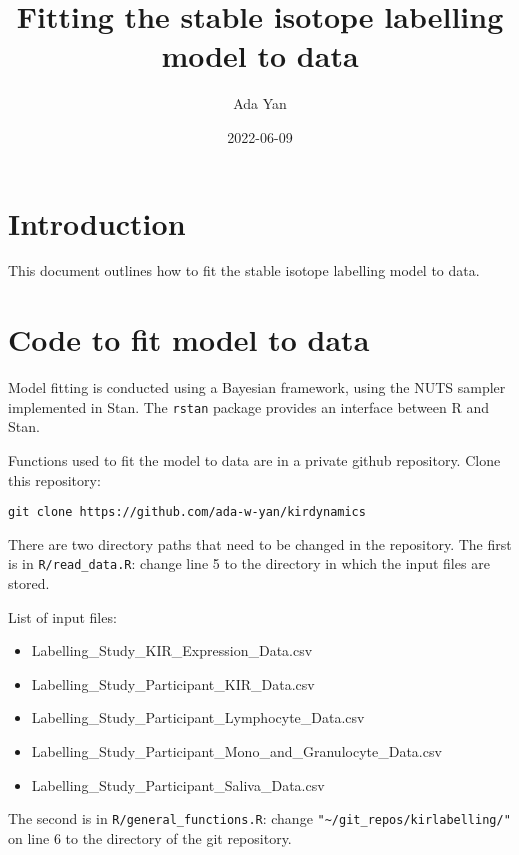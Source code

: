\documentclass[
]{article}
\title{Fitting the stable isotope labelling model to data}
\author{Ada Yan}
\date{2022-06-09}
\providecommand{\tightlist}{%
  \setlength{\itemsep}{0pt}\setlength{\parskip}{0pt}}
\begin{document}
\maketitle

\hypertarget{introduction}{%
\section{Introduction}\label{introduction}}

This document outlines how to fit the stable isotope labelling model to
data.

\hypertarget{code-to-fit-model-to-data}{%
\section{Code to fit model to data}\label{code-to-fit-model-to-data}}

Model fitting is conducted using a Bayesian framework, using the NUTS
sampler implemented in Stan. The \texttt{rstan} package provides an
interface between R and Stan.

Functions used to fit the model to data are in a private github
repository. Clone this repository:

\begin{verbatim}
git clone https://github.com/ada-w-yan/kirdynamics
\end{verbatim}

There are two directory paths that need to be changed in the repository.
The first is in \texttt{R/read\_data.R}: change line 5 to the directory
in which the input files are stored.

List of input files:

\begin{itemize}
\tightlist
\item
  Labelling\_Study\_KIR\_Expression\_Data.csv
\item
  Labelling\_Study\_Participant\_KIR\_Data.csv
\item
  Labelling\_Study\_Participant\_Lymphocyte\_Data.csv
\item
  Labelling\_Study\_Participant\_Mono\_and\_Granulocyte\_Data.csv
\item
  Labelling\_Study\_Participant\_Saliva\_Data.csv
\end{itemize}

The second is in \texttt{R/general\_functions.R}: change
\texttt{"\textasciitilde{}/git\_repos/kirlabelling/"} on line 6 to the
directory of the git repository.
\end{document}
